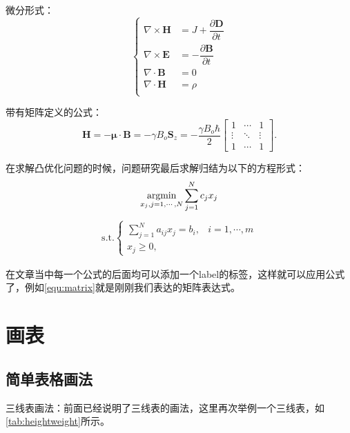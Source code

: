 微分形式：
\begin{equation}
    \begin{cases}
        \nabla\times\mathbf{H}&=J+\dfrac{\partial\mathbf{D}}{\partial{t}}\\
        \nabla\times\mathbf{E}&=-\dfrac{\partial\mathbf{B}}{\partial{t}}\\
        \nabla\cdot\mathbf{B}&=0\\
        \nabla\cdot\mathbf{H}&=\rho\\
    \end{cases}
    \label{equ:diff-function}
\end{equation}

带有矩阵定义的公式：
\begin{equation}
    \mathbf{H} = -\mathbf\mu \cdot \mathbf{B} = -\gamma B_o \mathbf{S}_z = -\frac{\gamma B_o\hbar}{2} 
        \begin{bmatrix}
            1& \cdots &1\\ 
            \vdots & \ddots & \vdots \\
            1 & \cdots & 1 
        \end{bmatrix}.
    \label{equ:matrix}
\end{equation}

在求解凸优化问题的时候，问题研究最后求解归结为以下的方程形式：
\begin{equation}
    \mathop{\mathrm{argmin}}\limits_{x_{j},j=1,\cdots,N}\sum\limits_{j=1}^{N}c_{j}x_{j}
\end{equation}
\begin{eqnarray}
    \text{s.t.}\begin{cases}
        \sum\limits_{j=1}^{N}a_{ij}x_{j}=b_{i},&i=1,\cdots,{m}\\
        x_{j}\geq{0},
    \end{cases}
\end{eqnarray}

在文章当中每一个公式的后面均可以添加一个label的标签，这样就可以应用公式了，例如\cref{equ:matrix}就是刚刚我们表达的矩阵表达式。

\section{画表}
\subsection{简单表格画法}
三线表画法：前面已经说明了三线表的画法，这里再次举例一个三线表，如\autoref{tab:heightweight}所示。

